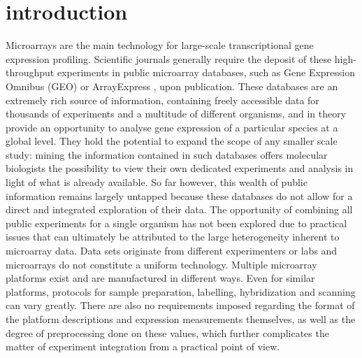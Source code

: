 
\section{introduction}

Microarrays are the main technology for large-scale transcriptional gene expression profiling. Scientific journals generally require the deposit of these high-throughput experiments in public microarray databases, such as Gene Expression Omnibus (GEO) \cite{Barrett2011} or ArrayExpress \cite{Parkinson2009}, upon publication. These databases are an extremely rich source of information, containing freely accessible data for thousands of experiments and a multitude of different organisms, and in theory provide an opportunity to analyse gene expression of a particular species at a global level. They hold the potential to expand the scope of any smaller scale study: mining the information contained in such databases offers molecular biologists the possibility to view their own dedicated experiments and analysis in light of what is already available. So far however, this wealth of public information remains largely untapped because these databases do not allow for a direct and integrated exploration of their data. The opportunity of combining all public experiments for a single organism has not been explored due to practical issues that can ultimately be attributed to the large heterogeneity inherent to microarray data. Data sets originate from different experimenters or labs and microarrays do not constitute a uniform technology. Multiple microarray platforms exist and are manufactured in different ways. Even for similar platforms, protocols for sample preparation, labelling, hybridization and scanning can vary greatly. There are also no requirements imposed \cite{Brazma2009, Brazma2001} regarding the format of the platform descriptions and expression measurements themselves, as well as the degree of preprocessing done on these values, which further complicates the matter of experiment integration from a practical point of view.

